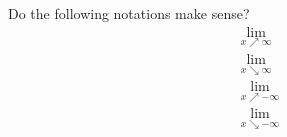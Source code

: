 Do the following notations make sense?
\begin{align*}
  \lim_{x\nearrow\infty} \\
  \lim_{x\searrow\infty} \\
  \lim_{x\nearrow-\infty} \\
  \lim_{x\searrow-\infty} 
\end{align*}
